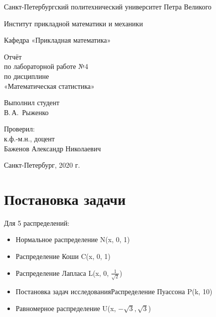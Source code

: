 \documentclass[12pt,a4paper]{scrartcl}
\begin{document}
\begin{titlepage}
  \begin{center}

    Санкт-Петербургский политехнический университет Петра Великого

    \vspace{0.25cm}
    
    Институт прикладной математики и механики
    
    Кафедра «Прикладная математика»
    \vfill

	\vspace{0.25cm}
	    Отчёт\\
	по лабораторной работе №4\\
	по дисциплине\\
	«Математическая статистика»

  \bigskip

\end{center}
\vfill

\newlength{\ML}
\hfill\begin{minipage}{0.4\textwidth}
  Выполнил студент\\ В.\,А.~Рыженко\\
\end{minipage}%
\bigskip

\hfill\begin{minipage}{0.4\textwidth}
  Проверил:\\
к.ф.-м.н., доцент\\
Баженов Александр Николаевич\\
\end{minipage}%
\vfill

\begin{center}
  Санкт-Петербург, 2020 г.
\end{center}
\end{titlepage}

\tableofcontents
\listoffigures
\newpage

\section{Постановка задачи}
 
Для 5 распределений:
\begin{itemize}
 \item Нормальное распределение N(x, 0, 1)
 \item Распределение Коши C(x, 0, 1)
 \item Распределение Лапласа L(x, 0, $\frac{1}{\sqrt2}$)
 \item Постановка задач исследованияРаспределение Пуассона P(k, 10)
 \item Равномерное распределение U(x, $-\sqrt{3}, \sqrt{3}$) 
\end{itemize}
 
\end{document}
